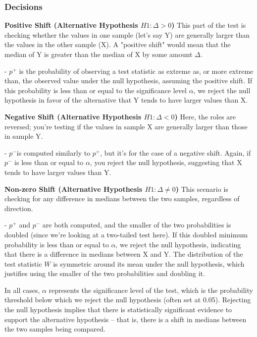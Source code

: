 \documentclass{article}
\begin{document}
\subsubsection{Decisions}

\textbf{Positive Shift (Alternative Hypothesis \( H1: \Delta > 0 \))}
This part of the test is checking whether the values in one sample (let's say Y) are generally larger than the values in the other sample (X). A "positive shift" would mean that the median of Y is greater than the median of X by some amount \(\Delta\).

- \( p^+ \) is the probability of observing a test statistic as extreme as, or more extreme than, the observed value under the null hypothesis, assuming the positive shift. If this probability is less than or equal to the significance level \( \alpha \), we reject the null hypothesis in favor of the alternative that Y tends to have larger values than X.

\textbf{Negative Shift (Alternative Hypothesis \( H1: \Delta < 0 \))}
Here, the roles are reversed; you're testing if the values in sample X are generally larger than those in sample Y.

- \( p^- \)is computed similarly to \( p^+ \), but it's for the case of a negative shift. Again, if \( p^- \) is less than or equal to \( \alpha \), you reject the null hypothesis, suggesting that X tends to have larger values than Y.

\textbf{Non-zero Shift (Alternative Hypothesis \( H1: \Delta \neq 0 \))}
This scenario is checking for any difference in medians between the two samples, regardless of direction.

- \( p^+ \) and \( p^- \) are both computed, and the smaller of the two probabilities is doubled (since we're looking at a two-tailed test here). If this doubled minimum probability is less than or equal to \( \alpha \), we reject the null hypothesis, indicating that there is a difference in medians between X and Y. The distribution of the test statistic \( W \) is symmetric around its mean under the null hypothesis, which justifies using the smaller of the two probabilities and doubling it.

In all cases, \( \alpha \) represents the significance level of the test, which is the probability threshold below which we reject the null hypothesis (often set at 0.05). Rejecting the null hypothesis implies that there is statistically significant evidence to support the alternative hypothesis – that is, there is a shift in medians between the two samples being compared.
\end{document}
